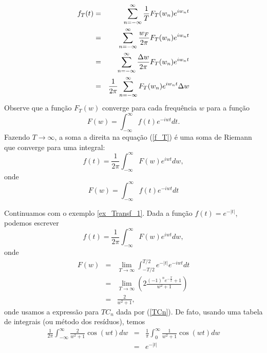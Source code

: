 \begin{eqnarray}
\nonumber f_T(t)&=&\sum_{n=-\infty}^\infty \frac{1}{T}F_T(w_n) e^{i w_n t}\\&=& \sum_{n=-\infty}^\infty \frac{w_F}{2\pi}F_T(w_n) e^{i w_n t}
\\\nonumber &=& \sum_{n=-\infty}^\infty \frac{\Delta w}{2\pi}F_T(w_n) e^{i w_n t}
\\{\label{f_T}}&=&\frac{1}{2\pi} \sum_{n=-\infty}^\infty F_T(w_n) e^{i w_n t}\Delta w
\end{eqnarray}
Observe que a função $F_T(w)$ converge para cada frequência $w$ para a função 
$$
F(w)=\int_{-\infty}^\infty f(t) e^{-iw t}dt.
$$
Fazendo $T\to \infty$, a soma a direita na equação (\ref{f_T}) é uma soma de Riemann que converge para uma integral:
$$
f(t)=\frac{1}{2\pi} \int_{-\infty}^\infty F(w)e^{iw t}dw,
$$
onde
\begin{equation}F(w)=\int_{-\infty}^{\infty}f(t)e^{-i w t}dt\end{equation}
\begin{ex} Continuamos com o exemplo \ref{ex_Transf_1}. Dada a função $f(t)=e^{-|t|}$, podemos escrever
$$
f(t)=\frac{1}{2\pi} \int_{-\infty}^\infty F(w)e^{iw t}dw,
$$
onde
\begin{eqnarray*}
F(w)&=&\lim_{T\to\infty}\int_{-T/2}^{T/2}e^{-|t|} e^{-i w t}dt\\
&=&\lim_{T\to\infty}\left(2\frac{ (-1)^ne^{-\frac{T}{2}}+1}{w^2+1} \right)\\
&=&\frac{2}{w^2+1},
\end{eqnarray*}
onde usamos a expressão para $TC_n$ dada por (\ref{TCn}). De fato, usando uma tabela de integrais (ou método dos resíduos), temos
\begin{eqnarray}
\frac{1}{2\pi} \int_{-\infty}^\infty \frac{2}{w^2+1} \cos(wt)dw
&=&\frac{1}{\pi} \int_{0}^\infty \frac{1}{w^2+1} \cos(wt)dw\\
&=&e^{-|t|}
\end{eqnarray}
\end{ex}
